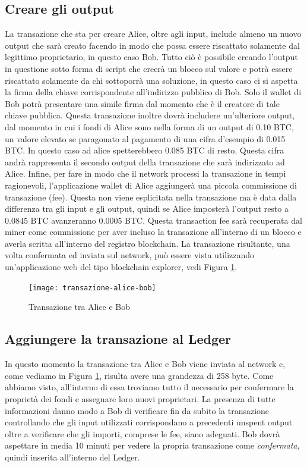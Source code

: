 \subsection*{Creare gli output}
La transazione che sta per creare Alice, oltre agli input, include almeno un nuovo output che sarà creato facendo in modo che possa essere riscattato solamente dal legittimo proprietario, in questo caso Bob. Tutto ciò è possibile creando l'output in questione sotto forma di script che creerà un blocco sul valore e potrà essere riscattato solamente da chi sottoporrà una soluzione, in questo caso ci si aspetta la firma della chiave corrispondente all'indirizzo pubblico di Bob. Solo il wallet di Bob potrà presentare una simile firma dal momento che è il creatore di tale chiave pubblica. 
Questa transazione inoltre dovrà includere un'ulteriore output, dal momento in cui i fondi di Alice sono nella forma di un output di 0.10 BTC, un valore elevato se paragonato al pagamento di una cifra d'esempio di 0.015 BTC. In questo caso ad alice spetterebbero 0.085 BTC di resto. Questa cifra andrà rappresenta il secondo output della transazione che sarà indirizzato ad Alice.
Infine, per fare in modo che il network processi la transazione in tempi ragionevoli, l'applicazione wallet di Alice aggiungerà una piccola commissione di transazione (fee). Questa non viene esplicitata nella transazione ma è data dalla differenza tra gli input e gli output, quindi se Alice imposterà l'output resto a 0.0845 BTC avanzeranno 0.0005 BTC. Questa transaction fee sarà recuperata dal miner come commissione per aver incluso la transazione all'interno di un blocco e averla scritta all'interno del registro blockchain. La transazione risultante, una volta confermata ed inviata sul network, può essere vista utilizzando un'applicazione web del tipo blockchain explorer, vedi Figura \ref{fig:transazione-alice-bob}.
\begin{figure}
	\centering 
	\texttt{[image: transazione-alice-bob]} 
	\caption[Transazione tra Alice e Bob]{Transazione tra Alice e Bob}
	\label{fig:transazione-alice-bob} 
\end{figure}

\subsection*{Aggiungere la transazione al Ledger}
In questo momento la transazione tra Alice e Bob viene inviata al network e, come vediamo in Figura \ref{fig:transazione-alice-bob}, risulta avere una grandezza di 258 byte. Come abbiamo visto, all'interno di essa troviamo tutto il necessario per confermare la proprietà dei fondi e assegnare loro nuovi proprietari. La presenza di tutte informazioni danno modo a Bob di verificare fin da subito la transazione controllando che gli input utilizzati corrispondano a precedenti unspent output oltre a verificare che gli importi, comprese le fee, siano adeguati. Bob dovrà aspettare in media 10 minuti per vedere la propria transazione come \textit{confermata}, quindi inserita all'interno del Ledger.

